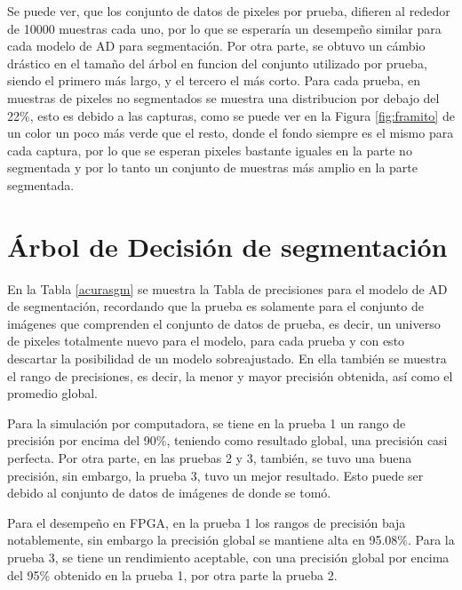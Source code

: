\documentclass[twoside,spanish,ESP,MSc]{plantillaLabUPV}
\theoremstyle{definition}
\begin{document}
Se puede ver, que los conjunto de datos de pixeles por prueba, difieren al rededor de 10000 muestras cada uno, por lo que se esperaría un desempeño similar para cada modelo de AD para segmentación. Por otra parte, se obtuvo un cámbio drástico en el tamaño del árbol en funcion del conjunto utilizado por prueba, siendo el primero más largo, y el tercero el más corto. Para cada prueba, en muestras de pixeles no segmentados se muestra una distribucion por debajo del 22\%, esto es debido a las capturas, como se puede ver en la Figura \ref{fig:framito} de un color un poco más verde que el resto, donde el fondo siempre es el mismo para cada captura, por lo que se esperan pixeles bastante iguales en la parte no segmentada y por lo tanto un conjunto de muestras más amplio en la parte segmentada. 

\section{Árbol de Decisión de segmentación}

En la Tabla \ref{acurasgm} se muestra la Tabla de precisiones para el modelo de AD de segmentación, recordando que la prueba es solamente para el conjunto de imágenes que comprenden el conjunto de datos de prueba, es decir, un universo de pixeles totalmente nuevo para el modelo, para cada prueba y con esto descartar la posibilidad de un modelo sobreajustado. En ella también se muestra el rango de precisiones, es decir, la menor y mayor precisión obtenida, así como el promedio global.  


Para la simulación por computadora, se tiene en la prueba 1 un rango de precisión por encima del 90\%, teniendo como resultado global, una precisión casi perfecta. Por otra parte, en las pruebas 2 y 3, también, se tuvo una buena precisión, sin embargo, la prueba 3, tuvo un mejor resultado. Esto puede ser debido al conjunto de datos de imágenes de donde se tomó.  

Para el desempeño en FPGA, en la prueba 1 los rangos de precisión baja notablemente, sin embargo la precisión global se mantiene alta en 95.08\%. Para la prueba 3, se tiene un rendimiento aceptable, con una precisión global por encima del 95\% obtenido en la prueba 1, por otra parte la prueba 2.
\end{document}
